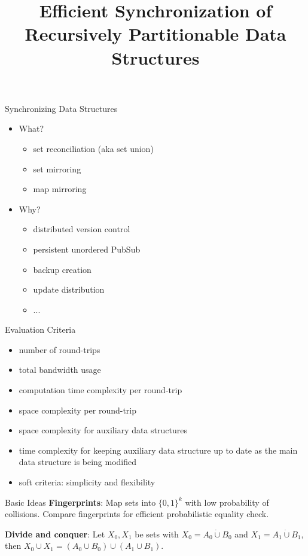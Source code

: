 \documentclass{beamer}
\title[]{Efficient Synchronization of Recursively Partitionable Data Structures}
\date{}
\newcommand{\set}[1]{\{#1\}}
\newcommand{\disjointunion}[2]{{#1} \dot{\cup} {#2}}
\begin{document}
\frame{\titlepage}

\begin{frame}{Synchronizing Data Structures}
\begin{itemize}
  \item What?
  \begin{itemize}
    \item set reconciliation (aka set union)
    \item set mirroring
    \item map mirroring
  \end{itemize}
  \item Why?
    \begin{itemize}
    \item distributed version control
    \item persistent unordered PubSub
    \item backup creation
    \item update distribution
    \item ...
  \end{itemize}
\end{itemize}
\end{frame}

\begin{frame}{Evaluation Criteria}
\begin{itemize}
\item number of round-trips
\item total bandwidth usage
\item computation time complexity per round-trip
\item space complexity per round-trip
\item space complexity for auxiliary data structures
\item time complexity for keeping auxiliary data structure up to date as the main data structure is being modified
\item soft criteria: simplicity and flexibility
\end{itemize}
\end{frame}

\begin{frame}{Basic Ideas}
\textbf{Fingerprints}: Map sets into $\set{0, 1}^k$ with low probability of collisions. Compare fingerprints for efficient probabilistic equality check.

\pause
\vspace{24pt}

\textbf{Divide and conquer}: Let $X_0, X_1$ be sets with $X_0 = \disjointunion{A_0}{B_0}$ and $X_1 = \disjointunion{A_1}{B_1}$, then $X_0 \cup X_1 = (A_0 \cup B_0) \cup (A_1 \cup B_1)$.
\end{frame}
\end{document}
